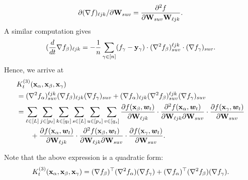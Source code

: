 \[
{\partial}(\nabla f)_{\ell j k } / \partial {\mathbf{W}} _{suv} = \frac{\partial^2 f}{\partial {\mathbf{W}} _{suv} {\mathbf{W}} _{\ell j k}}.
\] 
A similar computation gives
\[
	(\frac{d}{dt} \nabla f_\beta)_{\ell j k } = -\frac{1}{n} \sum_{\gamma\in[n]} (f_\gamma- {\mathbf{y}}_\gamma) \cdot (\nabla^2 f_\beta)^{\ell j k}_{suv} \cdot (\nabla f_\gamma)_{suv}.
\]
Hence, we arrive at
\begin{align*}
	& {K}^{(3)}_t({\mathbf{x}}_\alpha,{\mathbf{x}}_\beta,{\mathbf{x}}_\gamma) \nonumber\\
	& = (\nabla^2 f_\alpha)^{\ell j k }_{s u v} (\nabla f_\beta)_{\ell j k } (\nabla f_\gamma)_{suv}  + (\nabla f_\alpha)_{\ell j k } (\nabla^2 f_\beta)^{\ell j k }_{s u v} (\nabla f_\gamma)_{s u v} \\
	& = \sum_{\ell \in [L]} \sum_{j \in[p_\ell]} \sum_{k\in[q_\ell]} \sum_{s \in [L]} \sum_{u\in [p_s]} \sum_{v \in [q_s]} \frac{\partial f({\mathbf{x}}_\beta, {\boldsymbol{w}}_t)}{\partial {\mathbf{W}} _{\ell j k }} \cdot \frac{\partial^2 f({\mathbf{x}}_\alpha, {\boldsymbol{w}}_t)}{\partial {\mathbf{W}} _{\ell j k} \partial {\mathbf{W}} _{s u v}} \cdot \frac{\partial f({\mathbf{x}}_\gamma, {\boldsymbol{w}}_t)}{ {\partial} {\mathbf{W}} _{suv}} \\
	& \qquad + \frac{\partial f({\mathbf{x}}_\alpha, {\boldsymbol{w}}_t)}{\partial {\mathbf{W}} _{\ell j k }} \cdot \frac{\partial^2 f({\mathbf{x}}_\beta, {\boldsymbol{w}}_t)}{\partial {\mathbf{W}} _{\ell j k} \partial {\mathbf{W}} _{s u v}} \cdot \frac{\partial f({\mathbf{x}}_\gamma, {\boldsymbol{w}}_t)}{{\partial} {\mathbf{W}} _{suv}} \nonumber.
\end{align*}	

Note that the above expression is a quadratic form:
\[
	{K}^{(3)}_t({\mathbf{x}}_\alpha,{\mathbf{x}}_\beta,{\mathbf{x}}_\gamma) = (\nabla f_{\beta})^\top (\nabla^2 f_\alpha) (\nabla f_\gamma) + (\nabla f_{\alpha})^\top (\nabla^2 f_\beta) (\nabla f_\gamma).
\]

